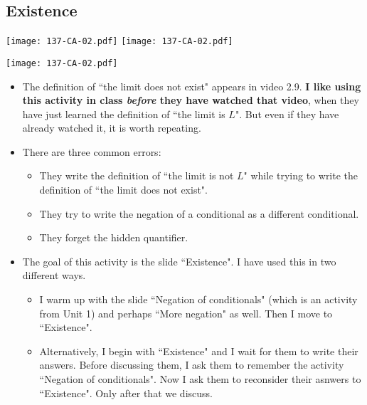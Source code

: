 \documentclass[11pt]{article}
\newcommand{\n}{\newpage}
\newcommand{\nl}{\hfill \vspace{-1.1\baselineskip}} %
\begin{document}
\n
\newpage
\subsection{Existence} 

\begin{center}
{ \texttt{[image: 137-CA-02.pdf]}}
\quad
{ \texttt{[image: 137-CA-02.pdf]}}

{ \texttt{[image: 137-CA-02.pdf]}}
\end{center}

\vspace{-1cm}

\begin{comments}
\nl
	\begin{itemize}
		\item  The definition of ``the limit does not exist" appears in video 2.9.  \textbf{I like using this activity in class \emph{before} they have watched that video}, when they have just learned the definition of ``the limit is $L$".  But even if they have already watched it, it is worth repeating.
		\item There are three common errors:
			\begin{itemize}
				\item  They write the definition of ``the limit is not $L$" while trying to write the definition of ``the limit does not exist".
				\item  They try to write the negation of a conditional as a different conditional.
				\item  They forget the hidden quantifier.
			\end{itemize}
		\item The goal of this activity is the slide ``Existence".  I have used this in two different ways.
			\begin{itemize}
				\item I warm up with the slide ``Negation of conditionals" (which is an activity from Unit 1) and perhaps ``More negation" as well.  Then I move to ``Existence".  
				\item Alternatively, I begin with ``Existence" and I wait for them to write their answers.  Before discussing them, I ask them to remember the activity ``Negation of conditionals".  Now I ask them to reconsider their asnwers to ``Existence".  Only after that we discuss.
			\end{itemize}
	\end{itemize}
\end{comments}
\end{document}
